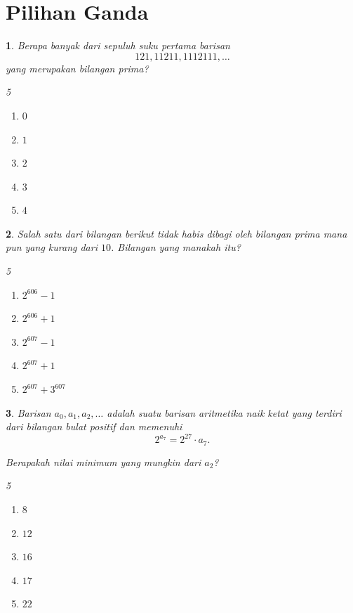 \documentclass[11pt,a4paper,DIV=12]{scrartcl}
\theoremstyle{problemstyle}
\newtheorem{problem}{}
\theoremstyle{answerstyle}
\newenvironment{choices}[1][5]{%
  \begin{multicols}{#1}%
  \begin{enumerate}[label=(\Alph*)]%
}{%
  \end{enumerate}%
  \end{multicols}%
}
\begin{document}
\section*{Pilihan Ganda}
\begin{problem}
  Berapa banyak dari sepuluh suku pertama barisan
  \[
    121,11211,1112111,\dots
  \]
  yang merupakan bilangan prima?

  \begin{choices}
    \item $0$
    \item $1$
    \item $2$
    \item $3$
    \item $4$
  \end{choices}
\end{problem}
\begin{problem}
  Salah satu dari bilangan berikut tidak habis dibagi oleh bilangan prima mana pun yang kurang dari \(10\).
  Bilangan yang manakah itu?

  \begin{choices}
    \item $2^{606}-1$
    \item $2^{606}+1$
    \item $2^{607}-1$
    \item $2^{607}+1$
    \item $2^{607}+3^{607}$
  \end{choices}
\end{problem}
\begin{problem}
  Barisan \(a_0,a_1,a_2,\dots\) adalah suatu barisan aritmetika naik ketat yang terdiri dari bilangan bulat positif dan memenuhi
  \[
    2^{a_7}=2^{27}\cdot a_7.
  \]

  Berapakah nilai minimum yang mungkin dari \(a_2\)?

  \begin{choices}
    \item $8$
    \item $12$
    \item $16$
    \item $17$
    \item $22$
  \end{choices}
\end{problem}
\end{document}
